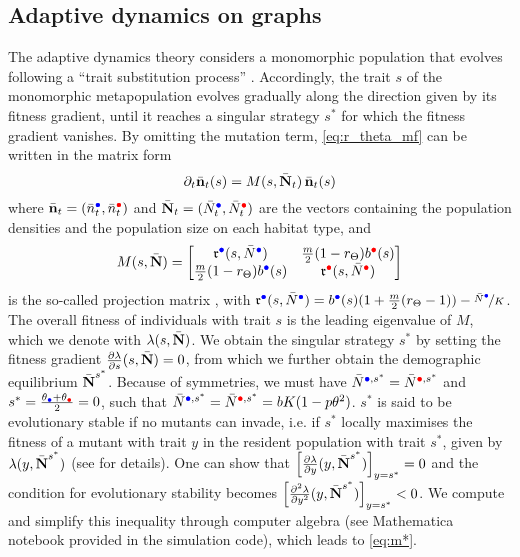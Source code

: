 \subsection{Adaptive dynamics on graphs}
The adaptive dynamics theory considers a monomorphic population that evolves following a “trait substitution process” \cite{Meszena1997}. Accordingly, the trait $s$ of the monomorphic metapopulation evolves gradually along the direction given by its fitness gradient, until it reaches a singular strategy $s^*$ for which the fitness gradient vanishes. By omitting the mutation term, \cref{eq:r_theta_mf} can be written in the matrix form
\begin{equation}
  \partial_t \bar{\textbf n}_t(s) = M(s, \bar{\textbf N}_t) \, \bar{\textbf n}_t(s)
\end{equation}
where $\bar{\textbf n}_t = (\bar{n}^{\bcirc}_t, \bar{n}^{\rcirc}_t)$ and
$\bar{\textbf N}_t = (\bar{N}^{\bcirc}_t, \bar{N}^{\rcirc}_t)$ are the vectors containing the population densities and the population size on each habitat type, and
\begin{equation}
M(s, \bar{\textbf N}) = 
\begin{bmatrix}
  \rr^{\bcirc}(s,\bar{N}^{\bcirc}) & \tfrac{m}{2} (1-r_\Theta)b^{\rcirc}(s) \\
  \tfrac{m}{2} (1-r_\Theta)b^{\bcirc}(s) & \rr^{\rcirc}(s,\bar{N}^{\rcirc})
\end{bmatrix}
\end{equation} 
is the so-called projection matrix \cite{Meszena1997}, with 
$\rr^{\bcirc}(s,\bar{N}^{\bcirc}) = b^{{\bcirc}}(s)(1+\tfrac{m}{2} (r_\Theta-1)) - \nicefrac{\bar{N}^{\bcirc}}{K}$. The overall fitness of individuals with trait $s$ is the leading eigenvalue of $M$, which we denote with $\lambda(s,\bar{\textbf N})$. We obtain the singular strategy $s^*$ by setting the fitness gradient $\frac{\partial \lambda}{\partial s} (s, \bar{\textbf N}) = 0$, from which we further obtain the demographic equilibrium $\bar{\textbf N}^{s^{*}}$. Because of symmetries, we must have $\bar{N}^{\bcirc,s^*} = \bar{N}^{\rcirc,s^*} $ and $s^* = \frac{\theta_{\bcirc} +\theta_{\rcirc}}{2} =0$, such that $\bar{N}^{\bcirc,s^*} = \bar{N}^{\rcirc,s^*} = bK(1 - p \theta^2)$. $s^*$ is said to be evolutionary stable if no mutants can invade, i.e. if $s^*$ locally maximises the fitness of a mutant with trait $y$ in the resident population with trait $s^*$, given by $\lambda(y, \bar{\textbf N}^{s^*})$ (see \cite{Meszena1997} for details). One can show that $\left[ \frac{\partial \lambda}{\partial y}(y, \bar{\textbf N}^{s^*}) \right]_{y = s^*} = 0$ and the condition for evolutionary stability becomes $ \left[ \frac{\partial^2 \lambda}{\partial y^2}(y, \bar{\textbf N}^{s^*}) \right]_{y = s^*} < 0 $. We compute and simplify this inequality through computer algebra (see Mathematica notebook provided in the simulation code), which leads to \cref{eq:m*}.

